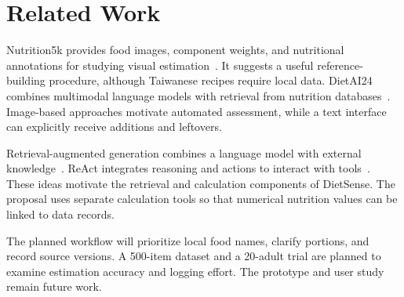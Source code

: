 \documentclass[11pt,a4paper]{article}
\begin{document}
\section{Related Work}
Nutrition5k provides food images, component weights, and nutritional annotations for studying visual estimation~\cite{nutrition5k}. It suggests a useful reference-building procedure, although Taiwanese recipes require local data. DietAI24 combines multimodal language models with retrieval from nutrition databases~\cite{dietai24}. Image-based approaches motivate automated assessment, while a text interface can explicitly receive additions and leftovers.

Retrieval-augmented generation combines a language model with external knowledge~\cite{rag}. ReAct integrates reasoning and actions to interact with tools~\cite{react}. These ideas motivate the retrieval and calculation components of DietSense. The proposal uses separate calculation tools so that numerical nutrition values can be linked to data records.

The planned workflow will prioritize local food names, clarify portions, and record source versions. A 500-item dataset and a 20-adult trial are planned to examine estimation accuracy and logging effort. The prototype and user study remain future work.
\end{document}
